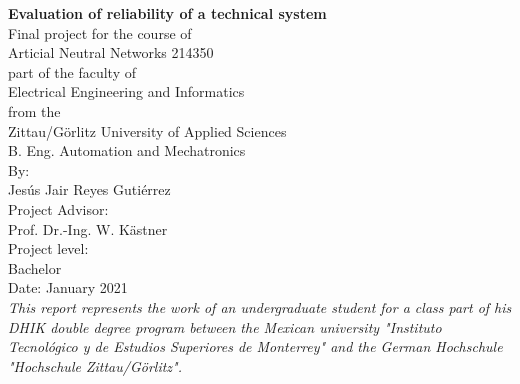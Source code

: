\documentclass{article}
\begin{document}
 






\begin{center}
    \Huge{\textbf{Evaluation of reliability of a technical system}}
    \\ 
    \vspace{10mm}
    \large{
    Final project for the course of \\
    Articial Neutral Networks 214350 \\
    part of the faculty of\\
    Electrical Engineering and Informatics\\
    from the \\
    Zittau/Görlitz University of Applied Sciences\\
    }
    \Large{
    \vspace{15mm}
    {\huge B. Eng. Automation and Mechatronics} \\
    \vspace{15mm} 
    {\LARGE By:} \\
    \vspace{5mm}
    Jesús Jair Reyes Gutiérrez \\
    \vspace {15mm}
    {\LARGE Project Advisor:} \\
    \vspace{5mm}
    Prof. Dr.-Ing. W. Kästner \\
    \vspace {15mm}
    {\LARGE Project level:}\\ 
    \vspace{5mm}
    Bachelor\\ 
    \vspace {15mm}
    Date: January 2021 \\ 
    }
    \vspace{15mm}
    \large{\textit{This report represents the work of an undergraduate student for a class part of his DHIK double degree program between the Mexican university "Instituto Tecnológico y de Estudios Superiores de Monterrey" and the German Hochschule "Hochschule Zittau/Görlitz".}}
\end{center}






\newpage
{}
\setcounter{page}{1}
\end{document}
